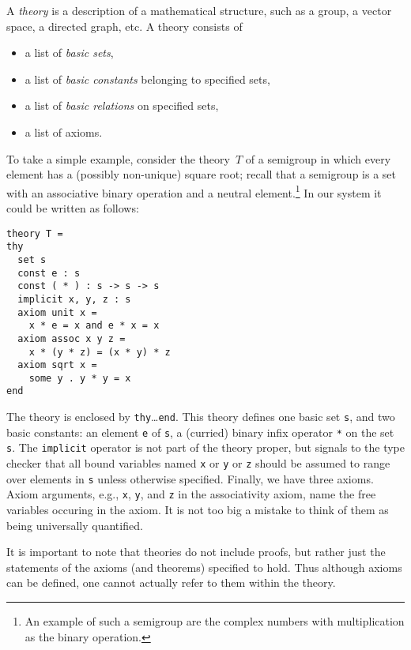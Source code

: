 \documentclass{article}
\begin{document}
A \emph{theory} is a description of a mathematical structure, such as
a group, a vector space, a directed graph, etc. A theory consists of
%
\begin{itemize}
\item a list of \emph{basic sets},
\item a list of \emph{basic constants} belonging to specified sets,
\item a list of \emph{basic relations} on specified sets,
\item a list of axioms.
\end{itemize}
%
To take a simple example, consider the theory~$T$ of a semigroup in
which every element has a (possibly non-unique) square root; recall
that a semigroup is a set with an associative binary operation and a
neutral element.\footnote{An example of such a semigroup are the
  complex numbers with multiplication as the binary operation.} In our
system it could be written as follows:
%
\begin{Verbatim}
theory T =
thy
  set s
  const e : s
  const ( * ) : s -> s -> s
  implicit x, y, z : s
  axiom unit x =
    x * e = x and e * x = x
  axiom assoc x y z =
    x * (y * z) = (x * y) * z
  axiom sqrt x =
    some y . y * y = x
end
\end{Verbatim}
%
The theory is enclosed by \Verb|thy|\ldots\Verb|end|. This theory
defines one basic set \Verb|s|, and two basic constants: an element
\Verb|e| of \Verb|s|, a (curried) binary infix operator \Verb|*| on
the set \Verb|s|. The \Verb|implicit| operator is not part of the
theory proper, but signals to the type checker that all bound
variables named \Verb|x| or \Verb|y| or \Verb|z| should be assumed to
range over elements in \Verb|s| unless otherwise specified. Finally,
we have three axioms. Axiom arguments, e.g., \Verb|x|, \Verb|y|, and
\Verb|z| in the associativity axiom, name the free variables occuring
in the axiom. It is not too big a mistake to think of them as being
universally quantified.

It is important to note that theories do not include proofs, but
rather just the statements of the axioms (and theorems) specified to
hold. Thus although axioms can be defined, one cannot actually refer
to them within the theory.
\end{document}
